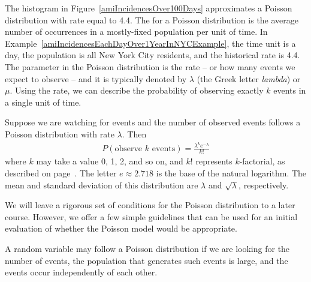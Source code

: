 The histogram in Figure~\ref{amiIncidencesOver100Days} approximates a Poisson distribution with rate equal to 4.4. The  for a Poisson distribution is the average number of occurrences in a mostly-fixed population per unit of time. In Example~\ref{amiIncidencesEachDayOver1YearInNYCExample}, the time unit is a day, the population is all New York City residents, and the historical rate is 4.4. The parameter in the Poisson distribution is the rate -- or how many events we expect to observe -- and it is typically denoted by $\lambda$
(the Greek letter \emph{lambda})  or $\mu$. Using the rate, we can describe the probability of observing exactly $k$ events in a single unit of time.

\begin{termBox}{
Suppose we are watching for events and the number of observed events follows a Poisson distribution with rate $\lambda$. Then
\begin{align*}
P(\text{observe $k$ events}) = \frac{\lambda^{k} e^{-\lambda}}{k!}
\end{align*}
where $k$ may take a value 0, 1, 2, and so on, and $k!$ represents $k$-factorial, as described on page~\pageref{factorialDefinitionInTheBinomialSection}. The letter $e\approx2.718$ is the base of the natural logarithm. The mean and standard deviation of this distribution are $\lambda$ and $\sqrt{\lambda}$, respectively.}
\end{termBox}

We will leave a rigorous set of conditions for the Poisson distribution to a later course. However, we offer a few simple guidelines that can be used for an initial evaluation of whether the Poisson model would be appropriate.

\begin{tipBox}{
A random variable may follow a Poisson distribution if we are looking for the number of events, the population that generates such events is large, and the events occur independently of each other.}
\end{tipBox}

